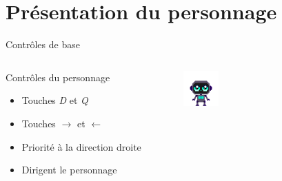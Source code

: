 \documentclass{beamer}
\begin{document}
{\section{Présentation du personnage}
\begin{frame}{Contrôles de base}
    \begin{columns}
            \begin{block}{Contrôles du personnage}
                \begin{itemize}
                    \item[\bullet] Touches \emph{D} et \emph{Q}
                    \item[\bullet] Touches $\rightarrow$ et $\leftarrow$
                    \item[\bullet] Priorité à la direction droite
                    \item[\bullet] Dirigent le personnage
                \end{itemize}
            \end{block}
            \begin{figure}
                \centering
                \includegraphics[width=0.8\textwidth]{character_placeholder}
            \end{figure}
    \end{columns}
\end{frame}

}
\end{document}
